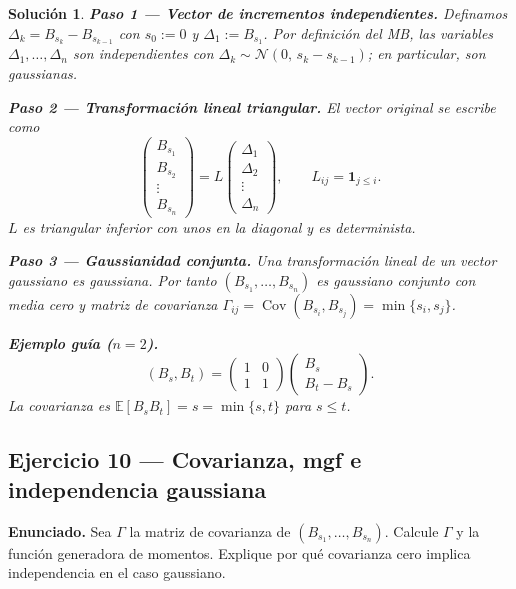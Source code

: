 \documentclass[12pt,letterpaper]{article}
\theoremstyle{ejercicio}
\theoremstyle{solucion}
\newtheorem*{solucion}{Solución}
\newcommand{\E}{\mathbb{E}}
\newcommand{\Cov}{\operatorname{Cov}}
\begin{document}
\begin{solucion}

\textbf{Paso 1 — Vector de incrementos independientes.}
Definamos $\Delta_k = B_{s_k}-B_{s_{k-1}}$ con $s_0:=0$ y $\Delta_1:=B_{s_1}$.
Por definición del MB, las variables $\Delta_1,\dots,\Delta_n$ son independientes con
$\Delta_k\sim\mathcal{N}(0,\,s_k-s_{k-1})$; en particular, son gaussianas.

\textbf{Paso 2 — Transformación lineal triangular.}
El vector original se escribe como
\[
  \begin{pmatrix}B_{s_1}\\ B_{s_2}\\ \vdots\\ B_{s_n}\end{pmatrix}
  = L
  \begin{pmatrix}\Delta_1\\ \Delta_2\\ \vdots\\ \Delta_n\end{pmatrix},
  \qquad
  L_{ij} = \mathbf{1}_{j\le i}.
\]
$L$ es triangular inferior con unos en la diagonal y es determinista.

\textbf{Paso 3 — Gaussianidad conjunta.}
Una transformación lineal de un vector gaussiano es gaussiana. Por tanto
$(B_{s_1},\dots,B_{s_n})$ es gaussiano conjunto con media cero y matriz de covarianza
$\Gamma_{ij}=\Cov(B_{s_i},B_{s_j})=\min\{s_i,s_j\}$.

\textbf{Ejemplo guía ($n=2$).}
\[
  (B_s,B_t) = \begin{pmatrix}1 & 0\\ 1 & 1\end{pmatrix}
              \begin{pmatrix}B_s\\ B_t-B_s\end{pmatrix}.
\]
La covarianza es $\E[B_sB_t]=s=\min\{s,t\}$ para $s\le t$. \checkmark
\end{solucion}

\subsection*{Ejercicio 10 — Covarianza, mgf e independencia gaussiana}

\begin{recuadro}
\textbf{Enunciado.} Sea $\Gamma$ la matriz de covarianza de $(B_{s_1},\dots,B_{s_n})$.
Calcule $\Gamma$ y la función generadora de momentos. Explique por qué covarianza cero
implica independencia en el caso gaussiano.
\end{recuadro}
\end{document}
